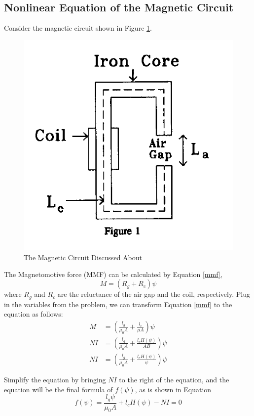 \documentclass[a4paper,titlepage]{article}
\begin{document}
		\subsection{Nonlinear Equation of the Magnetic Circuit}
			Consider the magnetic circuit shown in Figure \ref{mag_circuit}. 
			\begin{figure}[!h]
				\centering
				\includegraphics[width=0.8\linewidth]{mag_circuit}
				\caption{The Magnetic Circuit Discussed About}
				\label{mag_circuit}
			\end{figure}
		
			The Magnetomotive force (MMF) can be calculated by Equation \ref{mmf},
			\begin{equation}
				M = (R_g + R_c)\psi
				\label{mmf}
			\end{equation}
			where $R_g$ and $R_c$ are the reluctance of the air gap and the coil, respectively. Plug in the variables from the problem, we can transform Equation \ref{mmf} to the equation as follows:
			\begin{align*}
				M &= (\frac{l_g}{\mu_0A} + \frac{l_c}{\mu A})\psi \\
				NI &= (\frac{l_g}{\mu_0 A} + \frac{l_cH(\psi)}{AB})\psi \\
				NI &= (\frac{l_g}{\mu_0 A} + \frac{l_cH(\psi)}{\psi})\psi
			\end{align*}
			
			Simplify the equation by bringing $NI$ to the right of the equation, and the equation will be the final formula of $f(\psi)$, as is shown in Equation
			\begin{equation}
				f(\psi) = \frac{l_g \psi}{\mu_0 A} + l_cH(\psi) - NI = 0
			\end{equation}
			
\end{document}
